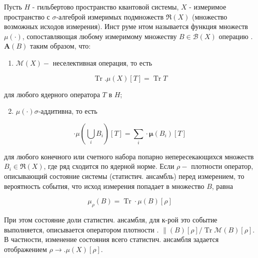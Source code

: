 \documentclass[10pt]{article}
\begin{document}
Пусть $H$ - гильбертово пространство квантовой системы, $X$ - измеримое пространство с $\sigma$-алгеброй измеримых подмножеств $\Re(X)$ (множество возможных исходов измерения). Инст руме нтом называется функция множеств $\mu(\cdot)$, сопоставляющая любому измеримому множеству $B \in \mathscr{B}(X)$ операцию . $\boldsymbol{A}(B)$ таким образом, что:



\begin{enumerate}

  \item $\mathscr{M}(X)-$ неселективная операция, то есть

\end{enumerate}



\[

\operatorname{Tr} . \mu(X)[T]=\operatorname{Tr} T

\]



для любого ядерного оператора $T$ в $H$;



\begin{enumerate}

  \setcounter{enumi}{1}

  \item $\mathscr{\mu}(\cdot) \sigma$-аддитивна, то есть

\end{enumerate}



\[

\cdot \mu\left(\bigcup_{i} B_{i}\right)[T]=\sum_{i} \cdot \boldsymbol{\mu}\left(B_{i}\right)[T]

\]



для любого конечного или счетного набора попарно непересекающихся множеств $B_{i} \in \Re(X)$, где ряд сходится по ядерной норме. Если $\rho-$ плотности оператор, описывающий состояние системы (статистич. ансамбль) перед измерением, то вероятность события, что исход измерения попадает в множество $B$, равна



\[

\mu_{\rho}(B)=\operatorname{Tr} \cdot \mu(B)[\rho]

\]



При этом состояние доли статистич. ансамбля, для к-рой это событие выполняется, описывается оператором плотности . $\|(B)[\rho] / \operatorname{Tr} \mathscr{M}(B)[\rho]$. В частности, изменение состояния всего статистич. ансамбля задается отображением $\rho \rightarrow . \mu(X)[\rho]$.
\end{document}

